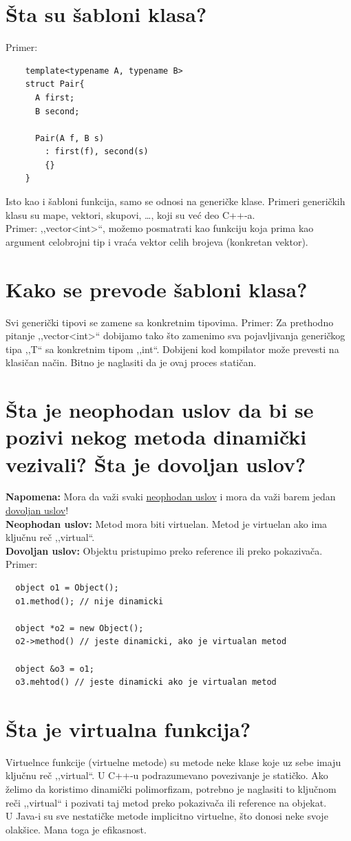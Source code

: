 \documentclass[a4paper]{article}
\begin{document}
\section{Šta su šabloni klasa?}
  \noindent Primer:
  \begin{lstlisting}
    template<typename A, typename B>
    struct Pair{
      A first;
      B second;
    
      Pair(A f, B s)
        : first(f), second(s)
        {}
    }\end{lstlisting}
  Isto kao i šabloni funkcija, samo se odnosi na generičke klase. Primeri generičkih klasu su mape, 
  vektori, skupovi, \dots, koji su već deo C++-a. \\
  \indent Primer: ,,vector<int>``, možemo posmatrati kao funkciju 
  koja prima kao argument celobrojni tip i vraća vektor celih brojeva (konkretan vektor).

\section{Kako se prevode šabloni klasa?}
  Svi generički tipovi se zamene sa konkretnim tipovima.
  Primer: Za prethodno pitanje ,,vector<int>`` dobijamo tako što zamenimo sva pojavljivanja generičkog 
  tipa ,,T`` sa konkretnim tipom ,,int``. Dobijeni kod kompilator može prevesti na klasičan način. 
  Bitno je naglasiti da je ovaj proces statičan.

\section{Šta je neophodan uslov da bi se pozivi nekog metoda dinamički vezivali? Šta je dovoljan uslov?}
  \textbf{Napomena:} Mora da važi svaki \underline{neophodan uslov} i 
  mora da važi barem jedan \underline{dovoljan uslov}!\\
  \textbf{Neophodan uslov:} Metod mora biti virtuelan. Metod je virtuelan ako ima ključnu reč ,,virtual``.\\
  \textbf{Dovoljan uslov:} Objektu pristupimo preko reference ili preko pokazivača.
  Primer:
  \begin{lstlisting}
  object o1 = Object();
  o1.method(); // nije dinamicki

  object *o2 = new Object();
  o2->method() // jeste dinamicki, ako je virtualan metod

  object &o3 = o1;
  o3.mehtod() // jeste dinamicki ako je virtualan metod\end{lstlisting}
\section{Šta je virtualna funkcija?}
  Virtuelnce funkcije (virtuelne metode) su metode neke klase koje uz sebe imaju ključnu reč ,,virtual``.
  U C++-u podrazumevano povezivanje je statičko. Ako želimo da koristimo dinamički polimorfizam, potrebno je
  naglasiti to ključnom reči ,,virtual`` i pozivati taj metod preko pokazivača ili reference na objekat.\\
  \indent U Java-i su sve nestatičke metode implicitno virtuelne, što donosi neke svoje olakšice. Mana 
  toga je efikasnost.
\end{document}
